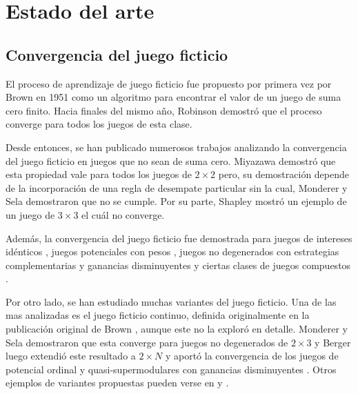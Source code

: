 \chapter{Estado del arte}  \label{cap:relwork}

\section{Convergencia del juego ficticio}

El proceso de aprendizaje de juego ficticio fue propuesto por primera vez por Brown en 1951 \cite{brown:1951} como un algoritmo para encontrar el valor de un juego de suma cero finito. Hacia finales del mismo año, Robinson \cite{robinson:zerosum} demostró que el proceso converge para todos los juegos de esta clase.

Desde entonces, se han publicado numerosos trabajos analizando la convergencia del juego ficticio en juegos que no sean de suma cero. Miyazawa \cite{miyazawa:2x2} demostró que esta propiedad vale para todos los juegos de $2 \times 2$ pero, su demostración depende de la incorporación de una regla de desempate particular sin la cual, Monderer y Sela \cite{2x2:without} demostraron que no se cumple. Por su parte, Shapley \cite{shapley:3x3} mostró un ejemplo de un juego de $3 \times 3$ el cuál no converge.

Además, la convergencia del juego ficticio fue demostrada para juegos de intereses idénticos \cite{identical:interests}, juegos potenciales con pesos \cite{weighted:potential}, juegos no degenerados con estrategias complementarias y ganancias disminuyentes \cite{strategic:complementarities} y ciertas clases de juegos compuestos \cite{compound}.

Por otro lado, se han estudiado muchas variantes del juego ficticio. Una de las mas analizadas es el juego ficticio continuo, definida originalmente en la publicación original de Brown \cite{brown:1951}, aunque este no la exploró en detalle. Monderer y Sela \cite{no:cycling} demostraron que esta converge para juegos no degenerados de $2 \times 3$ y Berger luego extendió este resultado a $2 \times N$ \cite{berger:2xn} y aportó la convergencia de los juegos de potencial ordinal y quasi-supermodulares con ganancias disminuyentes . Otros ejemplos de variantes propuestas pueden verse en \cite{pattern:recog} y \cite{new:kind:fp}. 

